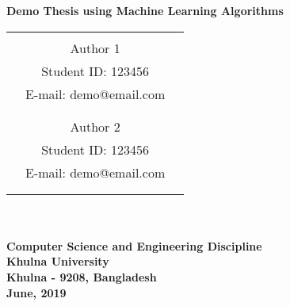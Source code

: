 \begin{center}
\Large \textbf{Demo Thesis using Machine Learning Algorithms\\}
\normalsize
\vspace{112pt}

\begin{tabular}{ccc}

\hline\noalign{\smallskip}
&&\\
&Author 1&\\
&Student ID: 123456&\\
&E-mail: demo@email.com&\\

&&\\
&&\\
&Author 2&\\
&Student ID: 123456&\\
&E-mail: demo@email.com&\\
&&\\

\noalign{\smallskip}\hline
\end{tabular}\\


\vspace{144pt}
\hspace{5cm} \makebox[6in]{\hrulefill}\\
\large
\textbf{Computer Science and Engineering Discipline}\\
\textbf{Khulna University} \\
\textbf{Khulna - 9208, Bangladesh}\\
\vspace{24pt}
\textbf{June, 2019}
\end{center}
